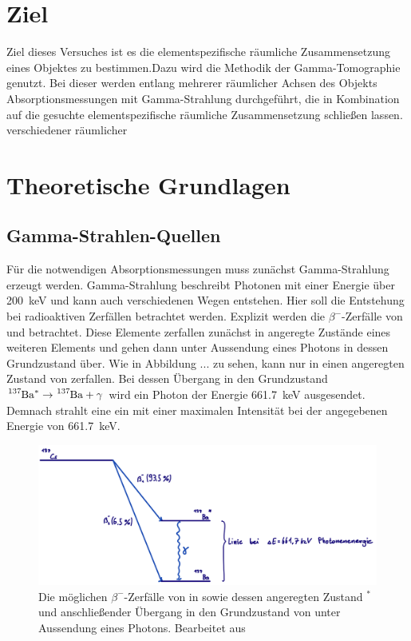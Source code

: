\section{Ziel}
    Ziel dieses Versuches ist es die elementspezifische räumliche Zusammensetzung eines Objektes zu bestimmen.Dazu wird die Methodik der Gamma-Tomographie genutzt. Bei dieser werden entlang mehrerer räumlicher
    Achsen des Objekts Absorptionsmessungen mit Gamma-Strahlung durchgeführt, die in Kombination auf die gesuchte elementspezifische räumliche Zusammensetzung schließen lassen.   
    verschiedener räumlicher  
\section{Theoretische Grundlagen}
    \subsection{Gamma-Strahlen-Quellen}
        Für die notwendigen Absorptionsmessungen muss zunächst Gamma-Strahlung erzeugt werden. Gamma-Strahlung beschreibt Photonen mit einer Energie über \SI{200}{\kilo\electronvolt} und kann auch verschiedenen
        Wegen entstehen. Hier soll die Entstehung bei radioaktiven Zerfällen betrachtet werden. Explizit werden die $\beta^-$-Zerfälle von  und  betrachtet. Diese Elemente zerfallen 
        zunächst in angeregte Zustände eines weiteren Elements und gehen dann unter Aussendung eines Photons in dessen Grundzustand über. Wie in Abbildung ... zu sehen, kann  nur in einen 
        angeregten Zustand von  zerfallen. Bei dessen Übergang in den Grundzustand $ \ce{^{137}Ba}^* \rightarrow \ce{^{137}Ba} + \gamma$ wird ein Photon der Energie \SI{661.7}{\kilo\electronvolt}
        ausgesendet. Demnach strahlt eine ein  mit einer maximalen Intensität bei der angegebenen Energie von \SI{661.7}{\kilo\electronvolt}.

        \FloatBarrier

        \begin{figure}[h]
          \centering
          \includegraphics[width = 1\textwidth]{pictures/cs.png}
          \caption{Die möglichen $\beta^-$-Zerfälle von  in  sowie dessen angeregten Zustand $^*$ und anschließender Übergang in den Grundzustand von  unter Aussendung eines Photons. Bearbeitet aus \cite{stolz_radioaktivitat_2003}}
          \label{fig:cs_schema}
        \end{figure}
    
